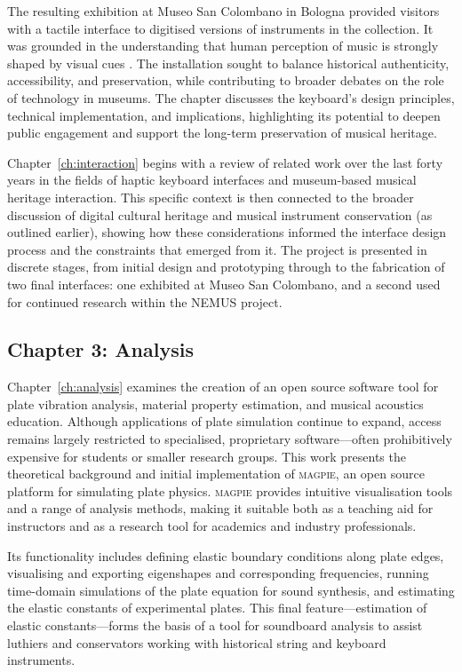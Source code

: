 The resulting exhibition at Museo San Colombano in Bologna provided visitors
with a tactile interface to digitised versions of instruments in the collection.
It was grounded in the understanding that human perception of music is strongly
shaped by visual cues \cite{fritz_player_2012, fritz_soloist_2014,
fritz_listener_2017, tsay_sight_2013}. The installation sought to balance
historical authenticity, accessibility, and preservation, while contributing to
broader debates on the role of technology in museums. The chapter discusses the
keyboard’s design principles, technical implementation, and implications,
highlighting its potential to deepen public engagement and support the long-term
preservation of musical heritage.

Chapter~\ref{ch:interaction} begins with a review of related work over the last
forty years in the fields of haptic keyboard interfaces and museum-based musical
heritage interaction. This specific context is then connected to the broader
discussion of digital cultural heritage and musical instrument conservation (as
outlined earlier), showing how these considerations informed the interface
design process and the constraints that emerged from it. The project is
presented in discrete stages, from initial design and prototyping through to the
fabrication of two final interfaces: one exhibited at Museo San Colombano, and a
second used for continued research within the NEMUS project.


\subsection{Chapter 3: Analysis}

Chapter~\ref{ch:analysis} examines the creation of an open source software tool
for plate vibration analysis, material property estimation, and musical
acoustics education. Although applications of plate simulation continue to
expand, access remains largely restricted to specialised, proprietary
software---often prohibitively expensive for students or smaller research groups.
This work presents the theoretical background and initial implementation of
\textsc{magpie}, an open source platform for simulating plate physics.
\textsc{magpie} provides intuitive visualisation tools and a range of analysis
methods, making it suitable both as a teaching aid for instructors and as a
research tool for academics and industry professionals.

Its functionality includes defining elastic boundary conditions along plate
edges, visualising and exporting eigenshapes and corresponding frequencies,
running time-domain simulations of the plate equation for sound synthesis, and
estimating the elastic constants of experimental plates. This final
feature---estimation of elastic constants---forms the basis of a tool for soundboard
analysis to assist luthiers and conservators working with historical string and
keyboard instruments.

